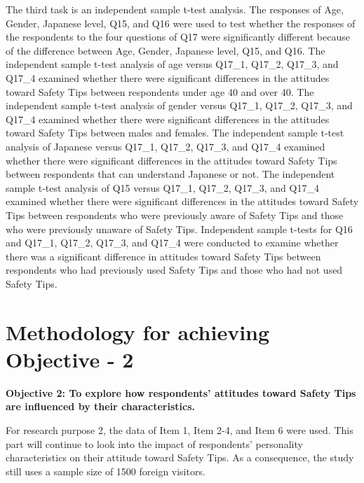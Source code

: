 The third task is an independent sample t-test analysis. The responses of Age, Gender, Japanese level, Q15, and Q16 were used to test whether the responses of the respondents to the four questions of Q17 were significantly different because of the difference between Age, Gender, Japanese level, Q15, and Q16. The independent sample t-test analysis of age versus Q17\_1, Q17\_2, Q17\_3, and Q17\_4 examined whether there were significant differences in the attitudes toward Safety Tips between respondents under age 40 and over 40.  The independent sample t-test analysis of gender versus Q17\_1, Q17\_2, Q17\_3, and Q17\_4 examined whether there were significant differences in the attitudes toward Safety Tips between males and females. The independent sample t-test analysis of Japanese versus Q17\_1, Q17\_2, Q17\_3, and Q17\_4 examined whether there were significant differences in the attitudes toward Safety Tips between respondents that can understand Japanese or not. The independent sample t-test analysis of Q15 versus Q17\_1, Q17\_2, Q17\_3, and Q17\_4 examined whether there were significant differences in the attitudes toward Safety Tips between respondents who were previously aware of Safety Tips and those who were previously unaware of Safety Tips. Independent sample t-tests for Q16 and Q17\_1, Q17\_2, Q17\_3, and Q17\_4 were conducted to examine whether there was a significant difference in attitudes toward Safety Tips between respondents who had previously used Safety Tips and those who had not used Safety Tips.


\section{Methodology for achieving Objective - 2 }
\textbf{Objective 2: To explore how respondents' attitudes toward Safety Tips are influenced by their characteristics. }

For research purpose 2, the data of Item 1, Item 2-4, and Item 6 were used. This part will continue to look into the impact of respondents' personality characteristics on their attitude toward Safety Tips. As a consequence, the study still uses a sample size of 1500 foreign visitors.

